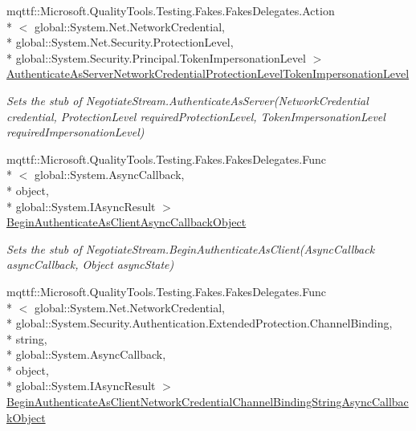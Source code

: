 \begin{DoxyCompactItemize}
mqttf\-::\-Microsoft.\-Quality\-Tools.\-Testing.\-Fakes.\-Fakes\-Delegates.\-Action\\*
$<$ global\-::\-System.\-Net.\-Network\-Credential, \\*
global\-::\-System.\-Net.\-Security.\-Protection\-Level, \\*
global\-::\-System.\-Security.\-Principal.\-Token\-Impersonation\-Level $>$ \hyperlink{class_system_1_1_net_1_1_security_1_1_fakes_1_1_stub_negotiate_stream_ab9ca1f1fe46cc4bf31ab8766d2427033}{Authenticate\-As\-Server\-Network\-Credential\-Protection\-Level\-Token\-Impersonation\-Level}
\begin{DoxyCompactList}\small\item\em Sets the stub of Negotiate\-Stream.\-Authenticate\-As\-Server(\-Network\-Credential credential, Protection\-Level required\-Protection\-Level, Token\-Impersonation\-Level required\-Impersonation\-Level)\end{DoxyCompactList}\item 
mqttf\-::\-Microsoft.\-Quality\-Tools.\-Testing.\-Fakes.\-Fakes\-Delegates.\-Func\\*
$<$ global\-::\-System.\-Async\-Callback, \\*
object, \\*
global\-::\-System.\-I\-Async\-Result $>$ \hyperlink{class_system_1_1_net_1_1_security_1_1_fakes_1_1_stub_negotiate_stream_ac82c906590aba07760e8d9de8af8f5cf}{Begin\-Authenticate\-As\-Client\-Async\-Callback\-Object}
\begin{DoxyCompactList}\small\item\em Sets the stub of Negotiate\-Stream.\-Begin\-Authenticate\-As\-Client(\-Async\-Callback async\-Callback, Object async\-State)\end{DoxyCompactList}\item 
mqttf\-::\-Microsoft.\-Quality\-Tools.\-Testing.\-Fakes.\-Fakes\-Delegates.\-Func\\*
$<$ global\-::\-System.\-Net.\-Network\-Credential, \\*
global\-::\-System.\-Security.\-Authentication.\-Extended\-Protection.\-Channel\-Binding, \\*
string, \\*
global\-::\-System.\-Async\-Callback, \\*
object, \\*
global\-::\-System.\-I\-Async\-Result $>$ \hyperlink{class_system_1_1_net_1_1_security_1_1_fakes_1_1_stub_negotiate_stream_aede3e5eb68f10b85dde9dfd6e095b5f3}{Begin\-Authenticate\-As\-Client\-Network\-Credential\-Channel\-Binding\-String\-Async\-Callback\-Object}

\end{DoxyCompactItemize}
